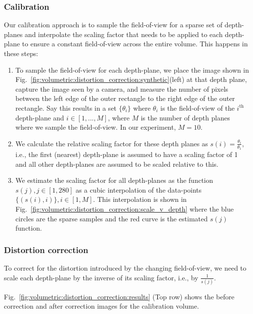 \subsubsection{Calibration}
\label{sec:volumetric:distortion_correction:calibration}
Our calibration approach is to sample the field-of-view for a sparse set of depth-planes and interpolate the scaling factor that needs to be applied to each depth-plane to ensure a constant field-of-view across the entire volume. This happens in these steps:


\begin{enumerate}
    \item To sample the field-of-view for each depth-plane, we place the image shown in Fig.~\ref{fig:volumetric:distortion_correction:synthetic}(left) at that depth plane, capture the image seen by a camera, and measure the number of pixels between the left edge of the outer rectangle to the right edge of the outer rectangle. Say this results in a set $\{\theta_i\}$ where $\theta_i$ is the field-of-view of the $i^{\text{th}}$ depth-plane and $i \in [1,...,M]$, where $M$ is the number of depth planes where we sample the field-of-view. In our experiment, $M = 10$.
    \item We calculate the relative scaling factor for these depth planes as $s(i) = \frac{\theta_i}{\theta_1}$, i.e., the first (nearest) depth-plane is assumed to have a scaling factor of 1 and all other depth-planes are assumed to be scaled relative to this.
    \item We estimate the scaling factor for all depth-planes as the function $s(j), j \in [1,280]$ as a cubic interpolation of the data-points $\{(s(i), i)\}, i\in [1,M]$. This interpolation is shown in Fig.~\ref{fig:volumetric:distortion_correction:scale_v_depth} where the blue circles are the sparse samples and the red curve is the estimated $s(j)$ function.
\end{enumerate}


\subsubsection{Distortion correction}
To correct for the distortion introduced by the changing field-of-view, we need to scale each depth-plane by the inverse of its scaling factor, i.e., by $\frac{1}{s(j)}$.

Fig.~\ref{fig:volumetric:distortion_correction:results} (Top row) shows the before correction and after correction images for the calibration volume.
